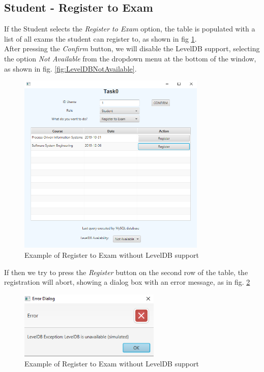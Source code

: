 \documentclass{report}
\begin{document}
\subsection*{Student - Register to Exam}
If the Student selects the \textit{Register to Exam} option, the table is populated with a list of all exams the student can register to, as shown in fig \ref{fig:RegisterToExamNotAvailable}.\\
After pressing the \textit{Confirm} button, we will disable the LevelDB support, selecting the option \textit{Not Available} from the dropdown menu at the bottom of the window, as shown in fig. \ref{fig:LevelDBNotAvailable}.
\begin{figure} [h!]
	\centering
	\includegraphics[width=0.8\textwidth]{RegisterToExamNotAvailable.png}
	\caption{Example of Register to Exam without LevelDB support}
	\label{fig:RegisterToExamNotAvailable}
\end{figure}
If then we try to press the \textit{Register} button on the second row of the table, the registration will abort, showing a dialog box with an error message, as in fig. \ref{fig:LevelDBErrorDialog}
\begin{figure} [h!]
	\centering
	\includegraphics[width=0.6\textwidth]{LevelDBErrorDialog.png}
	\caption{Example of Register to Exam without LevelDB support}
	\label{fig:LevelDBErrorDialog}
\end{figure}
\end{document}
